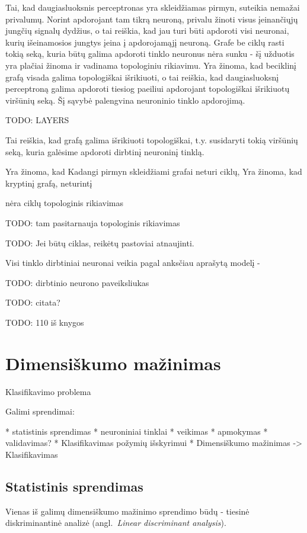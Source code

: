 \documentclass{VUMIFPSbakalaurinis}
\newcommand{\TODO}[1]{
\colorbox{todo-background-color}{TODO: #1}
}
\begin{document}
Tai, kad daugiasluoksnis perceptronas yra skleidžiamas pirmyn, suteikia nemažai privalumų.
Norint apdorojant tam tikrą neuroną, privalu žinoti visus įeinančiųjų jungčių signalų dydžius, o tai reiškia, kad jau turi būti apdoroti visi neuronai, kurių išeinamosios jungtys įeina į apdorojamąjį neuroną.
Grafe be ciklų rasti tokią seką, kuria būtų galima apdoroti tinklo neuronus nėra sunku - šį užduotis yra plačiai žinoma ir vadinama topologiniu rikiavimu.
Yra žinoma, kad beciklinį grafą visada galima topologiškai išrikiuoti, o tai reiškia, kad daugiasluoksnį perceptroną galima apdoroti tiesiog paeiliui apdorojant topologiškai išrikiuotų viršūnių seką.
Šį sąvybė palengvina neuroninio tinklo apdorojimą.

\TODO{LAYERS}

Tai reiškia, kad grafą galima išrikiuoti topologiškai, t.y. susidaryti tokią viršūnių seką, kuria galėsime apdoroti dirbtinį neuroninį tinklą.

Yra žinoma, kad 
Kadangi pirmyn skleidžiami grafai neturi ciklų,
Yra žinoma, kad kryptinį grafą, neturintį 

nėra ciklų
topologinis rikiavimas


\TODO{tam pasitarnauja topologinis rikiavimas}

\TODO{Jei būtų ciklas, reikėtų pastoviai atnaujinti.}


Visi tinklo dirbtiniai neuronai veikia pagal anksčiau aprašytą modelį - 



\TODO{dirbtinio neurono paveiksliukas}


\TODO{citata?}


\TODO{110 iš knygos}


\section{Dimensiškumo mažinimas}


Klasifikavimo problema

Galimi sprendimai:

	* statistinis sprendimas
	* neuroniniai tinklai
		* veikimas
		* apmokymas
		* validavimas?
		* Klasifikavimas požymių išskyrimui
		* Dimensiškumo mažinimas -> Klasifikavimas

\subsection{Statistinis sprendimas}

Vienas iš galimų dimensiškumo mažinimo sprendimo būdų - tiesinė diskriminantinė analizė (angl.~\textit{Linear discriminant analysis}).
\end{document}
